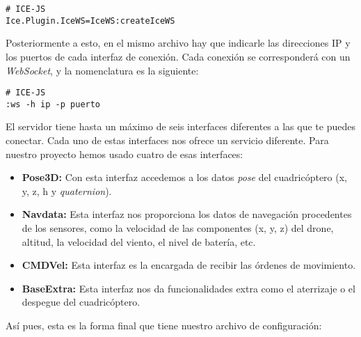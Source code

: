 \begin{lstlisting}[caption=Activación del plugin ICEJS]
# ICE-JS
Ice.Plugin.IceWS=IceWS:createIceWS
\end{lstlisting}

Posteriormente a esto, en el mismo archivo hay que indicarle las direcciones IP y los puertos de cada interfaz de conexión. Cada conexión se corresponderá con un \emph{WebSocket}, y la nomenclatura es la siguiente:\\

\begin{lstlisting}[caption=Formato \emph{endpoints} de los \emph{WebSocket} de ICEJS]
# ICE-JS
:ws -h ip -p puerto
\end{lstlisting}


El servidor tiene hasta un máximo de seis interfaces diferentes a las que te puedes conectar. Cada uno de estas interfaces nos ofrece un servicio diferente. Para nuestro proyecto hemos usado cuatro de esas interfaces:\\

\begin{itemize}
\item \textbf{Pose3D:} Con esta interfaz accedemos a los datos \emph{pose} del cuadricóptero (x, y, z, h y \emph{quaternion}).
\item \textbf{Navdata:} Esta interfaz nos proporciona los datos de navegación procedentes de los sensores, como la velocidad de las componentes (x, y, z) del drone, altitud, la velocidad del viento, el nivel de batería, etc.
\item \textbf{CMDVel:} Esta interfaz es la encargada de recibir las órdenes de movimiento.
\item \textbf{BaseExtra:} Esta interfaz nos da funcionalidades extra como el aterrizaje o el despegue del cuadricóptero.
\end{itemize}

Así pues, esta es la forma final que tiene nuestro archivo de configuración:\\

